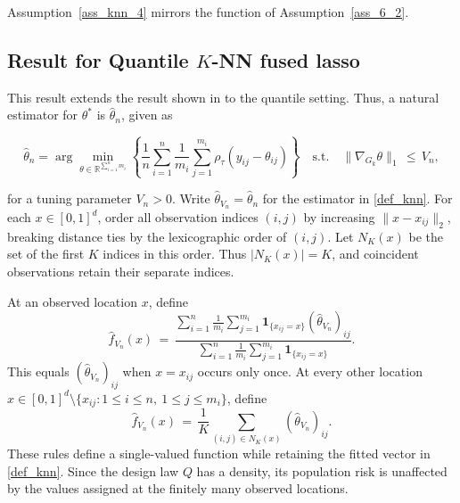 \documentclass[twoside,11pt]{article}
\newcommand{\rev}[1]{{\color{revisionred}#1}}
\newenvironment{revision}{\color{revisionred}}{}
\begin{document}
Assumption~\ref{ass_knn_4} mirrors the function of Assumption~\ref{ass_6_2}.



\subsection{Result for Quantile \( K \)-NN fused lasso}
\rev{This result extends the result shown in \cite{padilla2023temporal} to the quantile setting.} Thus, a natural estimator for \( \theta^* \) is \( \hat{\theta}_n \), given as

\begin{equation}
\label{def_knn}
\hat{\theta}_n = \arg\min_{\theta \in \mathbb{R}^{\sum_{i=1}^n m_i}} \left\{ \frac{1}{n} \sum_{i=1}^n \frac{1}{m_i} \sum_{j=1}^{m_i} \rho_{\tau}(y_{ij} - \theta_{ij}) \right\} \quad \text{s.t.} \quad \|\nabla_{G_k} \theta\|_1 \,\leq\, V_n,
\end{equation}

for a tuning parameter \( V_n > 0 \).
\begin{revision}
Write \(\hat{\theta}_{V_n}=\hat{\theta}_n\) for the estimator in
\eqref{def_knn}. For each \(x\in[0,1]^d\), order all observation
indices \((i,j)\) by increasing \(\|x-x_{ij}\|_2\), breaking distance
ties by the lexicographic order of \((i,j)\). Let \(N_K(x)\) be the
set of the first \(K\) indices in this order. Thus
\(|N_K(x)|=K\), and coincident observations retain their separate
indices.

At an observed location \(x\), define
\begin{equation}
\label{np_knn1}
\hat{f}_{V_n}(x)
\,=\,
\frac{\displaystyle\sum_{i=1}^n\frac{1}{m_i}
      \sum_{j=1}^{m_i}\mathbf{1}_{\{x_{ij}=x\}}
      (\hat{\theta}_{V_n})_{ij}}
     {\displaystyle\sum_{i=1}^n\frac{1}{m_i}
      \sum_{j=1}^{m_i}\mathbf{1}_{\{x_{ij}=x\}}}.
\end{equation}
This equals \((\hat{\theta}_{V_n})_{ij}\) when \(x=x_{ij}\)
occurs only once. At every other location
\(x\in[0,1]^d\setminus\{x_{ij}:1\le i\le n,\ 1\le j\le m_i\}\),
define
\begin{equation}
\label{np_knn2}
\hat{f}_{V_n}(x)
\,=\, \frac{1}{K}\sum_{(i,j)\in N_K(x)}
      (\hat{\theta}_{V_n})_{ij}.
\end{equation}
These rules define a single-valued function while retaining the
fitted vector in \eqref{def_knn}. Since the design law \(Q\) has
a density, its population risk is unaffected by the values assigned
at the finitely many observed locations.
\end{revision}
\end{document}
